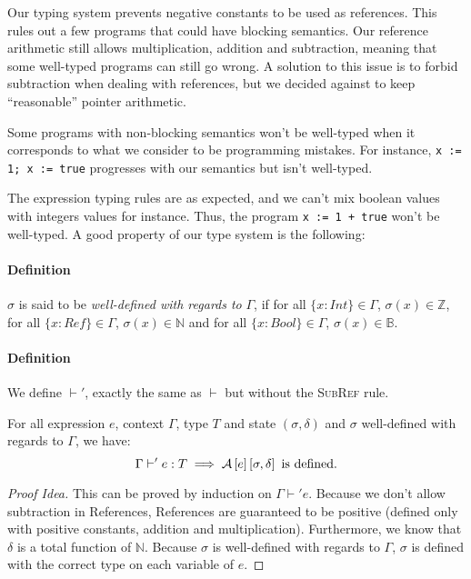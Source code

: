 Our typing system prevents negative constants to be used as references.
This rules out a few programs that could have blocking semantics.
Our reference arithmetic still allows multiplication, addition and subtraction, meaning that some well-typed programs can still go wrong.
A solution to this issue is to forbid subtraction when dealing with references, but we decided against to keep ``reasonable'' pointer arithmetic.

Some programs with non-blocking semantics won't be well-typed when it corresponds to what we consider to be programming mistakes. For instance, \texttt{x := 1; x := true} progresses with our semantics but isn't well-typed.

The expression typing rules are as expected, and we can't mix boolean values with integers values for instance. Thus, the program \texttt{x := 1 + true} won't be well-typed. A good property of our type system is the following:\\

\paragraph{Definition} $\sigma$ is said to be \textit{well-defined with regards to} $\Gamma$, if for all $\{x:Int\}\in\Gamma$, $\sigma(x)\in\mathbb{Z}$, for all $\{x:Ref\}\in\Gamma$, $\sigma(x)\in\mathbb{N}$ and for all $\{x:Bool\}\in\Gamma$, $\sigma(x)\in\mathbb{B}$.

\paragraph{Definition} We define $\vdash'$, exactly the same as $\vdash$ but without the \textsc{SubRef} rule.

\begin{thm}
For all expression $e$, context $\Gamma$, type $T$ and state $(\sigma, \delta)$ and $\sigma$ well-defined with regards to $\Gamma$, we have:
\[
\Gamma\vdash' e : T\implies \mathcal{A}\left[e\right]\left[\sigma,\delta\right]\text{ is defined}.
\]
\end{thm}

\begin{proof}[Proof Idea]
This can be proved by induction on $\Gamma\vdash' e$. Because we don't allow subtraction in References, References are guaranteed to be positive (defined only with positive constants, addition and multiplication). Furthermore, we know that $\delta$ is a total function of $\mathbb{N}$. Because $\sigma$ is well-defined with regards to $\Gamma$, $\sigma$ is defined with the correct type on each variable of $e$.
\end{proof}


